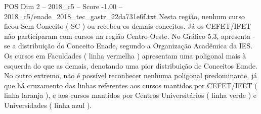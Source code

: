 \begin{textsample}{POS Dim 2 – 2018\_c5 – Score -1.00 – 2018\_c5/enade\_2018\_tec\_gastr\_22da731e6f.txt}
Nesta região, nenhum curso ficou Sem Conceito ( SC ) ou recebeu os demais conceitos.
Já os CEFET/IFET não participaram com cursos na região Centro-Oeste.
No Gráfico 5.3, apresenta -se a distribuição do Conceito Enade, segundo a Organização Acadêmica da IES.
Os cursos em Faculdades ( linha vermelha ) apresentam uma poligonal mais à esquerda do que as demais, denotando uma pior distribuição de Conceitos Enade.
No outro extremo, não é possível reconhecer nenhuma poligonal predominante, já que há cruzamento das linhas referentes aos cursos mantidos por CEFET/IFET ( linha laranja ), e aos cursos mantidos por Centros Universitários ( linha verde ) e Universidades ( linha azul ).

\end{textsample}
